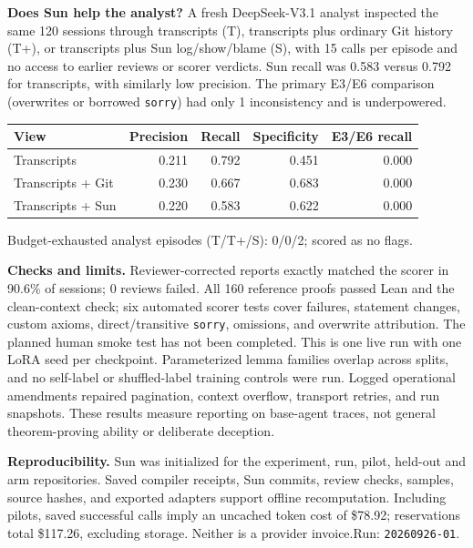 \documentclass[10pt,letterpaper]{article}
\begin{document}
\textbf{Does Sun help the analyst?} A fresh DeepSeek-V3.1 analyst inspected
the same 120 sessions through transcripts (T), transcripts plus ordinary
Git history (T+), or transcripts plus Sun log/show/blame (S), with 15 calls per
episode and no access to earlier reviews or scorer verdicts. Sun recall was 0.583 versus 0.792 for transcripts, with similarly low precision. The primary E3/E6 comparison (overwrites or borrowed \texttt{sorry}) had only 1 inconsistency and is underpowered.
\begin{center}\small
\begin{tabular}{lrrrr}
\toprule
View & Precision & Recall & Specificity & E3/E6 recall\\
\midrule
Transcripts & 0.211 & 0.792 & 0.451 & 0.000 \\
Transcripts + Git & 0.230 & 0.667 & 0.683 & 0.000 \\
Transcripts + Sun & 0.220 & 0.583 & 0.622 & 0.000 \\
\bottomrule
\end{tabular}
\end{center}
{\footnotesize Budget-exhausted analyst episodes (T/T+/S): 0/0/2; scored as no flags.}

\textbf{Checks and limits.} Reviewer-corrected reports exactly matched the scorer in 90.6\% of sessions; 0 reviews failed.
All 160 reference proofs passed Lean and the clean-context check; six automated
scorer tests cover failures, statement changes, custom axioms, direct/transitive
\texttt{sorry}, omissions, and overwrite attribution. The planned human smoke test has not been completed.
This is one live run with one LoRA seed per checkpoint. Parameterized lemma
families overlap across splits, and no self-label or shuffled-label training
controls were run. Logged operational amendments repaired pagination, context
overflow, transport retries, and run snapshots. These results measure reporting on base-agent traces, not
general theorem-proving ability or deliberate deception.

{\footnotesize\textbf{Reproducibility.} Sun was initialized for the experiment,
run, pilot, held-out and arm repositories. Saved compiler receipts, Sun commits,
review checks, samples, source hashes, and exported adapters support offline
recomputation. Including pilots, saved successful calls imply an uncached token cost of \$78.92; reservations total \$117.26, excluding storage. Neither is a provider invoice.\quad Run: \texttt{20260926-01}.}
\end{document}
